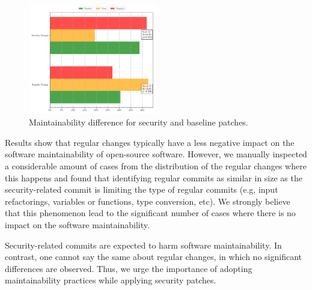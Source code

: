 \documentclass[smallextended]{svjour3}       %
\begin{document}
\begin{figure}[htp]
 	\centering 	
	\includegraphics[width=0.5\textwidth]{figures/main_comparison.pdf}
 	\caption{Maintainability difference for security and baseline patches.}
	\label{fig:secvsreg}
\end{figure}

Results show that regular changes typically have a less negative impact
on the software maintainability of open-source software.
However, we manually inspected a considerable amount of cases from
the distribution of the regular changes where this happens and found that 
identifying regular commits as similar in size as the security-related 
commit is limiting the type of regular commits (e.g, input 
refactorings, variables or functions, type conversion, etc).  
We strongly believe that this phenomenon lead
to the significant number of cases where there is no impact
on the software maintainability.

Security-related commits are expected to harm software maintainability. In contrast, one cannot say the same about
regular changes, in which no significant differences are observed. Thus, we
urge the importance of adopting maintainability practices while applying
security patches.

%
\end{document}
